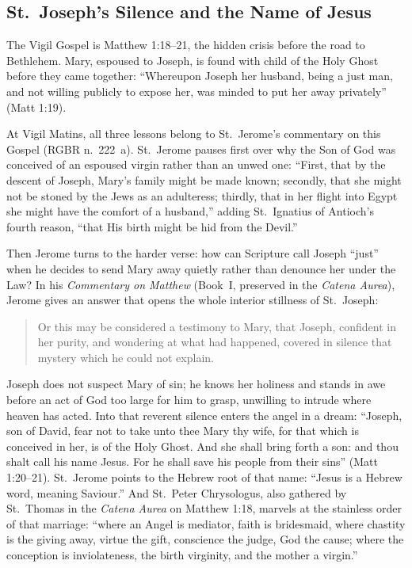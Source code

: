 \subsection{St.~Joseph's Silence and the Name of Jesus}

The Vigil Gospel is Matthew 1:18--21, the hidden crisis before the road to
Bethlehem. Mary, espoused to Joseph, is found with child of the Holy Ghost
before they came together: ``Whereupon Joseph her husband, being a just man,
and not willing publicly to expose her, was minded to put her away privately''
(Matt 1:19).

At Vigil Matins, all three lessons belong to St.~Jerome's commentary on this
Gospel (RGBR n.~222~a). St.~Jerome pauses first over why the Son of God was
conceived of an espoused virgin rather than an unwed one: ``First, that by the
descent of Joseph, Mary's family might be made known; secondly, that she might
not be stoned by the Jews as an adulteress; thirdly, that in her flight into
Egypt she might have the comfort of a husband,'' adding St.~Ignatius of
Antioch's fourth reason, ``that His birth might be hid from the Devil.''

Then Jerome turns to the harder verse: how can Scripture call Joseph ``just''
when he decides to send Mary away quietly rather than denounce her under the
Law? In his \textit{Commentary on Matthew} (Book~I, preserved in the
\textit{Catena Aurea}), Jerome gives an answer that opens the whole interior
stillness of St.~Joseph:

\begin{quote}
Or this may be considered a testimony to Mary, that Joseph, confident in her
purity, and wondering at what had happened, covered in silence that mystery
which he could not explain.
\end{quote}

Joseph does not suspect Mary of sin; he knows her holiness and stands in awe
before an act of God too large for him to grasp, unwilling to intrude where
heaven has acted. Into that reverent silence enters the angel in a dream:
``Joseph, son of David, fear not to take unto thee Mary thy wife, for that
which is conceived in her, is of the Holy Ghost. And she shall bring forth a
son: and thou shalt call his name Jesus. For he shall save his people from
their sins'' (Matt 1:20--21). St.~Jerome points to the Hebrew root of that
name: ``Jesus is a Hebrew word, meaning Saviour.'' And St.~Peter Chrysologus,
also gathered by St.~Thomas in the \textit{Catena Aurea} on Matthew 1:18,
marvels at the stainless order of that marriage: ``where an Angel is mediator,
faith is bridesmaid, where chastity is the giving away, virtue the gift,
conscience the judge, God the cause; where the conception is inviolateness, the
birth virginity, and the mother a virgin.''

